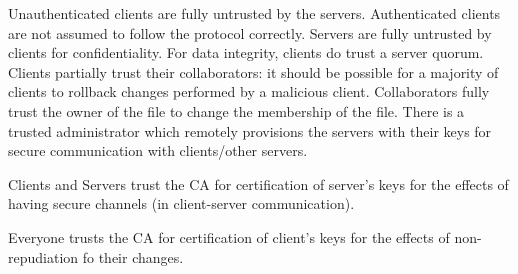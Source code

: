 Unauthenticated clients are fully untrusted by the servers.
Authenticated clients are not assumed to follow the protocol
correctly. Servers are fully untrusted by clients for confidentiality.
For data integrity, clients do trust a server quorum. Clients
partially trust their collaborators: it should be possible for
a majority of clients to rollback changes performed by a malicious client.
Collaborators fully trust the owner of the file to change the
membership of the file. There is a trusted administrator which
remotely provisions the servers with their keys for secure
communication with clients/other servers.

Clients and Servers trust the CA for certification of server's keys
for the effects of having secure channels (in client-server communication).

Everyone trusts the CA for certification of client's keys for the effects
of non-repudiation fo their changes.
